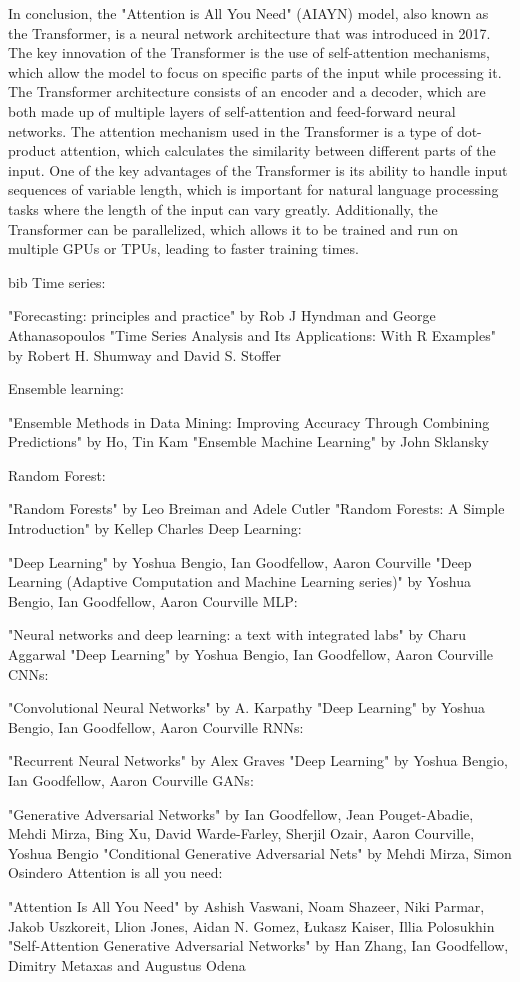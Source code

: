 In conclusion, the "Attention is All You Need" (AIAYN) model, also known as the Transformer, is a neural network architecture that was introduced in 2017.
The key innovation of the Transformer is the use of self-attention mechanisms, which allow the model to focus on specific parts of the input while processing it.
The Transformer architecture consists of an encoder and a decoder, which are both made up of multiple layers of self-attention and feed-forward neural networks.
The attention mechanism used in the Transformer is a type of dot-product attention, which calculates the similarity between different parts of the input.
One of the key advantages of the Transformer is its ability to handle input sequences of variable length, which is important for natural language processing tasks where the length of the input can vary greatly. 
Additionally, the Transformer can be parallelized, which allows it to be trained and run on multiple GPUs or TPUs, leading to faster training times.

bib
Time series:

\cite{Hyndman2018} "Forecasting: principles and practice" by Rob J Hyndman and George Athanasopoulos
\cite{Shumway2017} "Time Series Analysis and Its Applications: With R Examples" by Robert H. Shumway and David S. Stoffer

Ensemble learning:

\cite{Ho2009} "Ensemble Methods in Data Mining: Improving Accuracy Through Combining Predictions" by Ho, Tin Kam
\cite{Sklansky2013}"Ensemble Machine Learning" by John Sklansky

Random Forest:

"Random Forests" by Leo Breiman and Adele Cutler
"Random Forests: A Simple Introduction" by Kellep Charles
Deep Learning:

"Deep Learning" by Yoshua Bengio, Ian Goodfellow, Aaron Courville
"Deep Learning (Adaptive Computation and Machine Learning series)" by Yoshua Bengio, Ian Goodfellow, Aaron Courville
MLP:

"Neural networks and deep learning: a text with integrated labs" by Charu Aggarwal
"Deep Learning" by Yoshua Bengio, Ian Goodfellow, Aaron Courville
CNNs:

"Convolutional Neural Networks" by A. Karpathy
"Deep Learning" by Yoshua Bengio, Ian Goodfellow, Aaron Courville
RNNs:

"Recurrent Neural Networks" by Alex Graves
"Deep Learning" by Yoshua Bengio, Ian Goodfellow, Aaron Courville
GANs:

"Generative Adversarial Networks" by Ian Goodfellow, Jean Pouget-Abadie, Mehdi Mirza, Bing Xu, David Warde-Farley, Sherjil Ozair, Aaron Courville, Yoshua Bengio
"Conditional Generative Adversarial Nets" by Mehdi Mirza, Simon Osindero
Attention is all you need:

"Attention Is All You Need" by Ashish Vaswani, Noam Shazeer, Niki Parmar, Jakob Uszkoreit, Llion Jones, Aidan N. Gomez, Łukasz Kaiser, Illia Polosukhin
"Self-Attention Generative Adversarial Networks" by Han Zhang, Ian Goodfellow, Dimitry Metaxas and Augustus Odena

